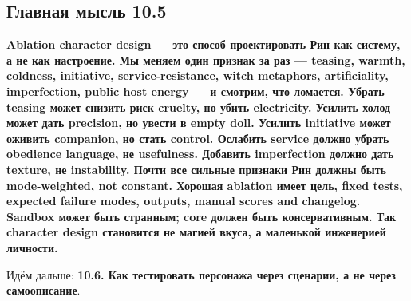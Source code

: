 \subsection*{Главная мысль 10.5}

\textbf{Ablation character design --- это способ проектировать Рин как
систему, а не как настроение. Мы меняем один признак за раз --- teasing,
warmth, coldness, initiative, service-resistance, witch metaphors,
artificiality, imperfection, public host energy --- и смотрим, что
ломается. Убрать teasing может снизить риск cruelty, но убить
electricity. Усилить холод может дать precision, но увести в empty doll.
Усилить initiative может оживить companion, но стать control. Ослабить
service должно убрать obedience language, не usefulness. Добавить
imperfection должно дать texture, не instability. Почти все сильные
признаки Рин должны быть mode-weighted, not constant. Хорошая ablation
имеет цель, fixed tests, expected failure modes, outputs, manual scores
and changelog. Sandbox может быть странным; core должен быть
консервативным. Так character design становится не магией вкуса, а
маленькой инженерией личности.}

Идём дальше: \textbf{10.6. Как тестировать персонажа через сценарии, а
не через самоописание}.
